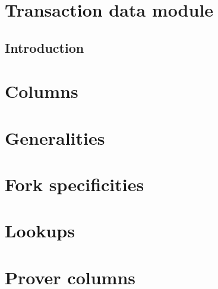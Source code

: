 
\section{Transaction data module}   \label{user txn data: generalities}
\subsection{Introduction}           \label{user txn data: intro}               
\section{Columns}                   \label{user txn data: columns}             

\section{Generalities}              \label{user txn data: generalities}        
\section{Fork specificities}        \label{user txn data: fork specificities}  
\iffalse  \fi                       \label{user txn data: processing}          
\section{Lookups}                   \label{user txn data: lookups}             
\section{Prover columns}            \label{user txn data: prover columns}      
